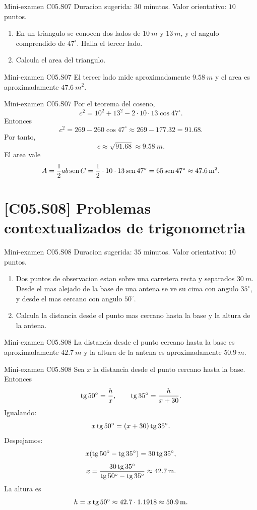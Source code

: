 \begin{exambrief}{Mini-examen C05.S07}
Duracion sugerida: \(30\) minutos. Valor orientativo: \(10\) puntos.
\begin{enumerate}
  \item En un triangulo se conocen dos lados de \(\SI{10}{m}\) y \(\SI{13}{m}\), y el angulo
  comprendido de \(47^\circ\). Halla el tercer lado.
  \item Calcula el area del triangulo.
\end{enumerate}
\end{exambrief}

\begin{shortanswer}{Mini-examen C05.S07}
El tercer lado mide aproximadamente \(\SI{9.58}{m}\) y el area es aproximadamente
\(\SI{47.6}{m^2}\).
\end{shortanswer}

\begin{fullsolution}{Mini-examen C05.S07}
Por el teorema del coseno,
\[
c^2=10^2+13^2-2\cdot 10\cdot 13\cos 47^\circ.
\]
Entonces
\[
c^2=269-260\cos 47^\circ\approx 269-177.32=91.68.
\]
Por tanto,
\[
c\approx \sqrt{91.68}\approx \SI{9.58}{m}.
\]
El area vale
\[
A=\frac12 ab\operatorname{sen} C=\frac12\cdot 10\cdot 13\operatorname{sen} 47^\circ
=65\operatorname{sen} 47^\circ\approx \SI{47.6}{m^2}.
\]
\end{fullsolution}

\section{[C05.S08] Problemas contextualizados de trigonometria}

\begin{exambrief}{Mini-examen C05.S08}
Duracion sugerida: \(35\) minutos. Valor orientativo: \(10\) puntos.
\begin{enumerate}
  \item Dos puntos de observacion estan sobre una carretera recta y separados \(\SI{30}{m}\).
  Desde el mas alejado de la base de una antena se ve su cima con angulo \(35^\circ\), y desde
  el mas cercano con angulo \(50^\circ\).
  \item Calcula la distancia desde el punto mas cercano hasta la base y la altura de la antena.
\end{enumerate}
\end{exambrief}

\begin{shortanswer}{Mini-examen C05.S08}
La distancia desde el punto cercano hasta la base es aproximadamente \(\SI{42.7}{m}\) y la
altura de la antena es aproximadamente \(\SI{50.9}{m}\).
\end{shortanswer}

\begin{fullsolution}{Mini-examen C05.S08}
Sea \(x\) la distancia desde el punto cercano hasta la base. Entonces
\[
\operatorname{tg} 50^\circ=\frac{h}{x},
\qquad
\operatorname{tg} 35^\circ=\frac{h}{x+30}.
\]
Igualando:
\[
x\operatorname{tg}50^\circ=(x+30)\operatorname{tg}35^\circ.
\]
Despejamos:
\[
x(\operatorname{tg}50^\circ-\operatorname{tg}35^\circ)=30\operatorname{tg}35^\circ,
\]
\[
x=\frac{30\operatorname{tg}35^\circ}{\operatorname{tg}50^\circ-\operatorname{tg}35^\circ}
\approx \SI{42.7}{m}.
\]
La altura es
\[
h=x\operatorname{tg}50^\circ\approx 42.7\cdot 1.1918\approx \SI{50.9}{m}.
\]
\end{fullsolution}
